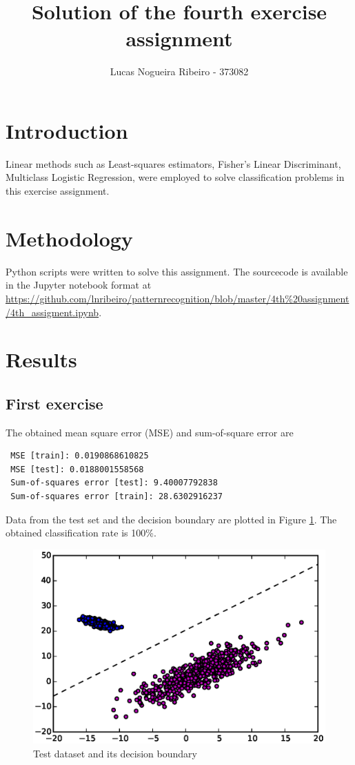\documentclass[a4paper,10pt]{article}
\title{Solution of the fourth exercise assignment}
\author{Lucas Nogueira Ribeiro - 373082}
\date{}
\begin{document}
\maketitle

\section{Introduction}
Linear methods such as Least-squares estimators, Fisher's Linear Discriminant, Multiclass Logistic Regression, were employed to solve classification problems in this exercise assignment.

\section{Methodology}
Python scripts were written to solve this assignment. The sourcecode is available in the Jupyter notebook format at 
 \url{https://github.com/lnribeiro/patternrecognition/blob/master/4th%20assignment/4th_assigment.ipynb}.

\section{Results}

\subsection*{First exercise}
The obtained mean square error (MSE) and sum-of-square error are
\begin{verbatim}
 MSE [train]: 0.0190868610825
 MSE [test]: 0.0188001558568
 Sum-of-squares error [test]: 9.40007792838
 Sum-of-squares error [train]: 28.6302916237
\end{verbatim}
Data from the test set and the decision boundary are plotted in Figure \ref{fig:1f1}. The obtained classification rate is 100\%.
\begin{figure}[htb]
 \centering
 \includegraphics[scale=0.7]{./figures/1f3.eps}
 \caption{Test dataset and its decision boundary}
 \label{fig:1f1}
\end{figure}
\end{document}
